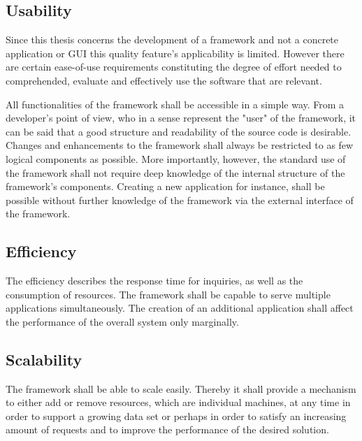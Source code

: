 \subsection{Usability}
Since this thesis concerns the development of a framework and not a concrete application or \ac{GUI} this quality feature's applicability is limited. However there are certain ease-of-use requirements constituting the degree of effort needed to comprehended, evaluate and effectively use the software that are relevant.  


All functionalities of the framework shall be accessible in a simple way. From a developer's point of view, who in a sense represent the "user" of the framework, it can be said that a good structure and readability of the source code is desirable. Changes and enhancements to the framework shall always be restricted to as few logical components as possible. More importantly, however, the standard use of the framework shall not require deep knowledge of the internal structure of the framework's components. Creating a new application for instance, shall be possible without further knowledge of the framework via the external interface of the framework.


\subsection{Efficiency}
The efficiency describes the response time for inquiries, as well as the consumption of resources. The framework shall be capable to serve multiple applications simultaneously. The creation of an additional application shall affect the performance of the overall system only marginally.

\subsection{Scalability}
The framework shall be able to scale easily. Thereby it shall provide a mechanism to either add or remove resources, which are individual machines, at any time in order to support a growing data set or perhaps in order to satisfy an increasing amount of requests and to improve the performance of the desired solution.

